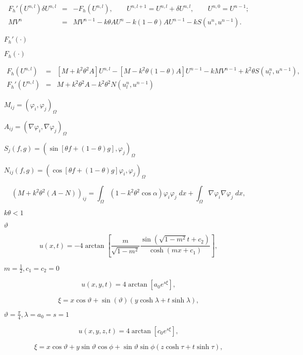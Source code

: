 \documentclass{article}
\begin{document}
\begin{eqnarray*} F_h'(U^{n,l})\delta U^{n,l} &=& -F_h(U^{n,l}), \qquad U^{n,l+1} = U^{n,l} + \delta U^{n,l}, \qquad U^{n,0} = U^{n-1}; \\ MV^n &=& MV^{n-1} - k \theta AU^n -k (1-\theta) AU^{n-1} - k S(u^n,u^{n-1}). \end{eqnarray*}
\pagebreak

$F_h'(\cdot)$
\pagebreak

$F_h(\cdot)$
\pagebreak

\begin{eqnarray*} F_h(U^{n,l}) &=& \left[ M+k^2\theta^2A \right] U^{n,l} - \left[ M-k^2\theta(1-\theta)A \right] U^{n-1} - k MV^{n-1} + k^2\theta S(u^n_l, u^{n-1}),\\ F_h'(U^{n,l}) &=& M+k^2\theta^2A - k^2\theta^2N(u^n_l,u^{n-1}) \end{eqnarray*}
\pagebreak

$M_{ij} = \left( \varphi_i,\varphi_j \right)_{\Omega}$
\pagebreak

$A_{ij} = \left( \nabla \varphi_i, \nabla \varphi_j \right)_{\Omega}$
\pagebreak

$S_j(f,g) = \left( \sin\left[ \theta f + (1-\theta) g\right], \varphi_j \right)_{\Omega}$
\pagebreak

$N_{ij}(f,g) = \left( \cos\left[ \theta f + (1-\theta) g\right]\varphi_i, \varphi_j \right)_{\Omega}$
\pagebreak

\[ (M+k^2\theta^2(A-N))_{ij} = \int_\Omega (1-k^2\theta^2 \cos \alpha) \varphi_i\varphi_j \; dx+\int_\Omega \nabla\varphi_i\nabla\varphi_j \; dx, \]
\pagebreak

$k\theta<1$
\pagebreak

$\vartheta$
\pagebreak

\[ u(x,t) = -4 \arctan\left[ \frac{m}{\sqrt{1-m^2}} \frac{\sin\left(\sqrt{1-m^2}t+c_2\right)} {\cosh\left(mx+c_1\right)} \right], \]
\pagebreak

$m=\frac 12, c_1=c_2=0$
\pagebreak

\[ u(x,y,t) = 4 \arctan \left[a_0 e^{s\xi}\right], \]
\pagebreak

\[ \xi = x \cos\vartheta + \sin(\vartheta) (y\cosh\lambda + t\sinh \lambda), \]
\pagebreak

$\vartheta=\frac \pi 4, \lambda=a_0=s=1$
\pagebreak

\[ u(x,y,z,t) = 4 \arctan \left[c_0 e^{s\xi}\right], \]
\pagebreak

\[ \xi = x \cos\vartheta + y \sin \vartheta \cos\phi + \sin \vartheta \sin\phi (z\cosh\tau + t\sinh \tau), \]
\pagebreak
\end{document}
